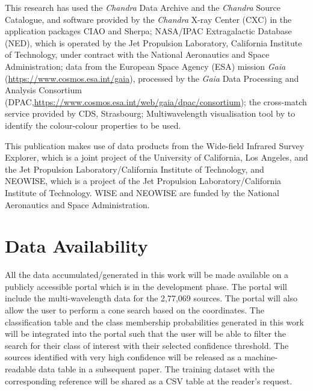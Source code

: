 \documentclass[fleqn,usenatbib]{mnras}
\begin{document}
This research has used the {\em Chandra} Data Archive and the {\em Chandra} Source Catalogue, and software provided by the {\em Chandra} X-ray Center (CXC) in the application packages CIAO and Sherpa; NASA/IPAC Extragalactic Database (NED), which is operated by the Jet Propulsion Laboratory, California Institute of Technology, under contract with the National Aeronautics and Space Administration; data from the European Space Agency (ESA) mission {\it Gaia} (\url{https://www.cosmos.esa.int/gaia}), processed by the {\it Gaia} Data Processing and Analysis Consortium (DPAC,\url{https://www.cosmos.esa.int/web/gaia/dpac/consortium}); the cross-match service provided by CDS, Strasbourg; Multiwavelength visualisation tool by \cite{2021RNAAS...5..102Y} to identify the colour-colour properties to be used.

This publication makes use of data products from the Wide-field Infrared Survey Explorer, which is a joint project of the University of California, Los Angeles, and the Jet Propulsion Laboratory/California Institute of Technology, and NEOWISE, which is a project of the Jet Propulsion Laboratory/California Institute of Technology. WISE and NEOWISE are funded by the National Aeronautics and Space Administration.
\section*{Data Availability}

All the data accumulated/generated in this work will be made available on a publicly accessible portal which is in the development phase. The portal will include the multi-wavelength data for the 2,77,069 sources. The portal will also allow the user to perform a cone search based on the coordinates. The classification table and the class membership probabilities generated in this work will be integrated into the portal such that the user will be able to filter the search for their class of interest with their selected confidence threshold. The sources identified with very high confidence will be released as a machine-readable data table in a subsequent paper. The training dataset with the corresponding reference will be shared as a CSV table at the reader's request. 



\end{document}

